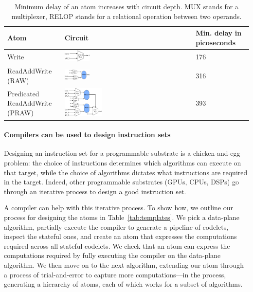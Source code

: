 \begin{table}[!t]
  \begin{scriptsize}
    \begin{tabular}{|p{}|p{}|p{}|}
  \hline
  Atom & Circuit & Min. delay in picoseconds \\
  \hline
  Write & \includegraphics[width=0.2\textwidth]{rw.pdf} & 176 \\
  \hline
  ReadAddWrite (RAW) & \includegraphics[width=0.2\textwidth]{raw.pdf} & 316\\
  \hline
  \pbox{0.1\textwidth}
  {Predicated\\
  ReadAddWrite (PRAW)} & \includegraphics[width=0.3\textwidth]{pred_raw.pdf}  & 393 \\
  \hline
  \end{tabular}
\end{scriptsize}
\caption{Minimum delay of an atom increases with circuit depth. MUX
stands for a multiplexer, RELOP stands for a relational operation between two
operands.}
\label{tab:circuits}
\end{table}


\paragraph{Compilers can be used to design instruction sets}
Designing an instruction set for a programmable substrate is a chicken-and-egg
problem: the choice of instructions determines which algorithms can execute on
that target, while the choice of algorithms dictates what instructions are
required in the target. Indeed, other programmable substrates (GPUs, CPUs,
DSPs) go through an iterative process to design a good instruction set.

 A compiler can help with this iterative process. To show how, we outline our
process for designing the atoms in Table~\ref{tab:templates}. We pick a
data-plane algorithm, partially execute the \pktlanguage compiler to generate a
pipeline of codelets, inspect the stateful ones, and create an atom that
expresses the computations required across all stateful codelets. We check that
an atom can express the computations required by fully executing the compiler
on the data-plane algorithm. We then move on to the next algorithm, extending
our atom through a process of trial-and-error to capture more computations---in
the process, generating a hierarchy of atoms, each of which works for a subset
of algorithms.

